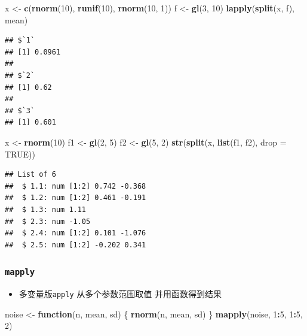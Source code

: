 \documentclass[]{book}
\newenvironment{Shaded}{\begin{snugshade}}{\end{snugshade}}
\newcommand{\ControlFlowTok}[1]{\textcolor[rgb]{0.13,0.29,0.53}{\textbf{#1}}}
\newcommand{\DataTypeTok}[1]{\textcolor[rgb]{0.13,0.29,0.53}{#1}}
\newcommand{\DecValTok}[1]{\textcolor[rgb]{0.00,0.00,0.81}{#1}}
\newcommand{\KeywordTok}[1]{\textcolor[rgb]{0.13,0.29,0.53}{\textbf{#1}}}
\newcommand{\NormalTok}[1]{#1}
\newcommand{\OperatorTok}[1]{\textcolor[rgb]{0.81,0.36,0.00}{\textbf{#1}}}
\newcommand{\OtherTok}[1]{\textcolor[rgb]{0.56,0.35,0.01}{#1}}
\newcommand{\StringTok}[1]{\textcolor[rgb]{0.31,0.60,0.02}{#1}}
\providecommand{\tightlist}{%
  \setlength{\itemsep}{0pt}\setlength{\parskip}{0pt}}
\begin{document}
\begin{Shaded}
\begin{Highlighting}[]
\NormalTok{x <-}\StringTok{ }\KeywordTok{c}\NormalTok{(}\KeywordTok{rnorm}\NormalTok{(}\DecValTok{10}\NormalTok{), }\KeywordTok{runif}\NormalTok{(}\DecValTok{10}\NormalTok{), }\KeywordTok{rnorm}\NormalTok{(}\DecValTok{10}\NormalTok{, }\DecValTok{1}\NormalTok{))}
\NormalTok{f <-}\StringTok{ }\KeywordTok{gl}\NormalTok{(}\DecValTok{3}\NormalTok{, }\DecValTok{10}\NormalTok{)}
\KeywordTok{lapply}\NormalTok{(}\KeywordTok{split}\NormalTok{(x, f), mean)}
\end{Highlighting}
\end{Shaded}

\begin{verbatim}
## $`1`
## [1] 0.0961
## 
## $`2`
## [1] 0.62
## 
## $`3`
## [1] 0.601
\end{verbatim}

\begin{Shaded}
\begin{Highlighting}[]
\NormalTok{x <-}\StringTok{ }\KeywordTok{rnorm}\NormalTok{(}\DecValTok{10}\NormalTok{)}
\NormalTok{f1 <-}\StringTok{ }\KeywordTok{gl}\NormalTok{(}\DecValTok{2}\NormalTok{, }\DecValTok{5}\NormalTok{)}
\NormalTok{f2 <-}\StringTok{ }\KeywordTok{gl}\NormalTok{(}\DecValTok{5}\NormalTok{, }\DecValTok{2}\NormalTok{)}
\KeywordTok{str}\NormalTok{(}\KeywordTok{split}\NormalTok{(x, }\KeywordTok{list}\NormalTok{(f1, f2), }\DataTypeTok{drop =} \OtherTok{TRUE}\NormalTok{))}
\end{Highlighting}
\end{Shaded}

\begin{verbatim}
## List of 6
##  $ 1.1: num [1:2] 0.742 -0.368
##  $ 1.2: num [1:2] 0.461 -0.191
##  $ 1.3: num 1.11
##  $ 2.3: num -1.05
##  $ 2.4: num [1:2] 0.101 -1.076
##  $ 2.5: num [1:2] -0.202 0.341
\end{verbatim}

\hypertarget{mapply}{%
\subsubsection{\texorpdfstring{\texttt{mapply}}{mapply}}\label{mapply}}

\begin{itemize}
\tightlist
\item
  多变量版\texttt{apply} 从多个参数范围取值 并用函数得到结果
\end{itemize}

\begin{Shaded}
\begin{Highlighting}[]
\NormalTok{noise <-}\StringTok{ }\ControlFlowTok{function}\NormalTok{(n, mean, sd) \{}
  \KeywordTok{rnorm}\NormalTok{(n, mean, sd)}
\NormalTok{\}}
\KeywordTok{mapply}\NormalTok{(noise, }\DecValTok{1}\OperatorTok{:}\DecValTok{5}\NormalTok{, }\DecValTok{1}\OperatorTok{:}\DecValTok{5}\NormalTok{, }\DecValTok{2}\NormalTok{)}
\end{Highlighting}
\end{Shaded}
\end{document}
